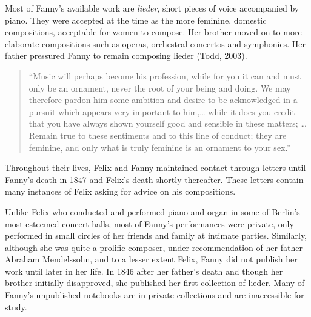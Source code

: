 \documentclass[12pt,twoside]{reedthesis}
\theoremstyle{definition}
\theoremstyle{definition}
\theoremstyle{definition}
\theoremstyle{remark}
\begin{document}
Most of Fanny's available work are \emph{lieder}, short pieces of voice
accompanied by piano. They were accepted at the time as the more
feminine, domestic compositions, acceptable for women to compose. Her
brother moved on to more elaborate compositions such as operas,
orchestral concertos and symphonies. Her father pressured Fanny to
remain composing lieder (Todd, 2003).
\begin{quote}
``Music will perhaps become his profession, while for you it can and
must only be an ornament, never the root of your being and doing. We may
therefore pardon him some ambition and desire to be acknowledged in a
pursuit which appears very important to him,\ldots{} while it does you
credit that you have always shown yourself good and sensible in these
matters; \ldots{} Remain true to these sentiments and to this line of
conduct; they are feminine, and only what is truly feminine is an
ornament to your sex.''
\end{quote}
Throughout their lives, Felix and Fanny maintained contact through
letters until Fanny's death in 1847 and Felix's death shortly
thereafter. These letters contain many instances of Felix asking for
advice on his compositions.

Unlike Felix who conducted and performed piano and organ in some of
Berlin's most esteemed concert halls, most of Fanny's performances were
private, only performed in small circles of her friends and family at
intimate parties. Similarly, although she was quite a prolific composer,
under recommendation of her father Abraham Mendelssohn, and to a lesser
extent Felix, Fanny did not publish her work until later in her life. In
1846 after her father's death and though her brother initially
disapproved, she published her first collection of lieder. Many of
Fanny's unpublished notebooks are in private collections and are
inaccessible for study.
\end{document}

